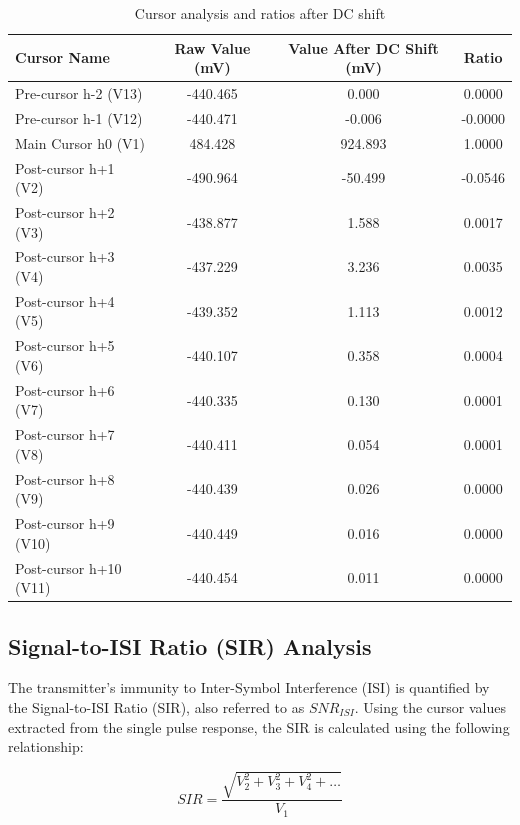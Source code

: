 \begin{table}[H]
    \centering
    \caption{Cursor analysis and ratios after DC shift}
    \label{tab:spr_cursors}
    \renewcommand{\arraystretch}{1.2}
    \small
    \begin{tabular}{lccc}
        \toprule
        \textbf{Cursor Name} & \textbf{Raw Value (mV)} & \textbf{Value After DC Shift (mV)} & \textbf{Ratio} \\
        \midrule
        Pre-cursor h-2 (V13) & -440.465 & 0.000 & 0.0000 \\
        Pre-cursor h-1 (V12) & -440.471 & -0.006 & -0.0000 \\
        Main Cursor h0 (V1)  & 484.428  & 924.893 & 1.0000 \\
        Post-cursor h+1 (V2) & -490.964 & -50.499 & -0.0546 \\
        Post-cursor h+2 (V3) & -438.877 & 1.588 & 0.0017 \\
        Post-cursor h+3 (V4) & -437.229 & 3.236 & 0.0035 \\
        Post-cursor h+4 (V5) & -439.352 & 1.113 & 0.0012 \\
        Post-cursor h+5 (V6) & -440.107 & 0.358 & 0.0004 \\
        Post-cursor h+6 (V7) & -440.335 & 0.130 & 0.0001 \\
        Post-cursor h+7 (V8) & -440.411 & 0.054 & 0.0001 \\
        Post-cursor h+8 (V9) & -440.439 & 0.026 & 0.0000 \\
        Post-cursor h+9 (V10)& -440.449 & 0.016 & 0.0000 \\
        Post-cursor h+10 (V11)& -440.454 & 0.011 & 0.0000 \\
        \bottomrule
    \end{tabular}
\end{table}
\subsection{Signal-to-ISI Ratio (SIR) Analysis}
The transmitter's immunity to Inter-Symbol Interference (ISI) is quantified by the Signal-to-ISI Ratio (SIR), 
also referred to as $SNR_{ISI}$. Using the cursor values extracted from the single pulse response, 
the SIR is calculated using the following relationship:

\begin{equation}
    SIR = \frac{\sqrt{V_{2}^{2} + V_{3}^{2} + V_{4}^{2} + \dots}}{V_{1}}
\end{equation}

